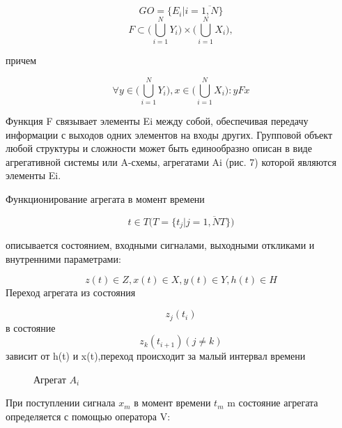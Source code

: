\documentclass[12pt]{article}
\begin{document}
\[
GO = \{ E_{i}|i = \overline{1,N}\}
\]
\[
F \subset  \Bigg( \bigcup_{i=1}^{N}Y_{i}       \Bigg)  \times \Bigg( \bigcup_{i=1}^{N}X_{i}  \Bigg), 
\]

причем

\[
\forall y  \in  \Bigg( \bigcup_{i=1}^{N}Y_{i}       \Bigg), x \in  \Bigg( \bigcup_{i=1}^{N}X_{i} \Bigg): yFx
\]
	

Функция F связывает элементы Ei
 между собой, обеспечивая передачу информации с выходов одних элементов на входы других.
Групповой объект любой структуры и сложности может быть единообразно описан в виде агрегативной системы или A-схемы, агрегатами Ai
 (рис. 7) которой являются элементы Ei.

Функционирование агрегата в момент времени 

\[
t \in T  \Bigg( T = \{t_{j} |j= \overline{1,NT} \}  \Bigg)
\]

описывается состоянием, входными
сигналами, выходными откликами и внутренними параметрами: 

\[
z(t) \in Z, x(t) \in X, y(t) \in Y, h(t) \in H
\]
Переход агрегата из состояния

\[
z_{j}(t_{i})
\]
в состояние
\[
z_{k}(t_{i+1}) (j \neq k) 
\]
зависит  от h(t) и x(t),переход происходит за малый интервал времени

\begin{figure}
\caption{Агрегат ${A_i}$}
\end{figure}


При поступлении сигнала ${x_m}$ в момент времени ${t_m}$
m состояние агрегата определяется с помощью оператора V:
\end{document}
